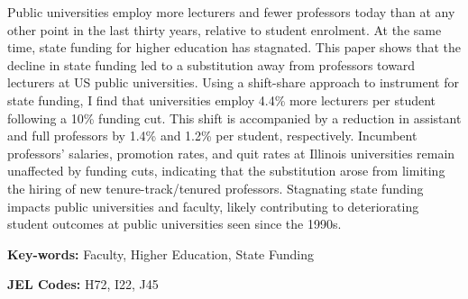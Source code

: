 Public universities employ more lecturers and fewer professors today than at any other point in the last thirty years, relative to student enrolment.
At the same time, state funding for higher education has stagnated.
This paper shows that the decline in state funding led to a substitution away from professors toward lecturers at US public universities.
Using a shift-share approach to instrument for state funding, I find that universities employ 4.4\% more lecturers per student following a 10\% funding cut.
This shift is accompanied by a reduction in assistant and full professors by 1.4\% and 1.2\%  per student, respectively.
Incumbent professors' salaries, promotion rates, and quit rates at Illinois universities remain unaffected by funding cuts, indicating that the substitution arose from limiting the hiring of new tenure-track/tenured professors.
Stagnating state funding impacts public universities and faculty, likely contributing to deteriorating student outcomes at public universities seen since the 1990s.

\vfill
\noindent
\textbf{Key-words:}
Faculty,
Higher Education,
State Funding

\vspace{0.05cm}
\noindent
\textbf{JEL Codes:} H72, I22, J45

